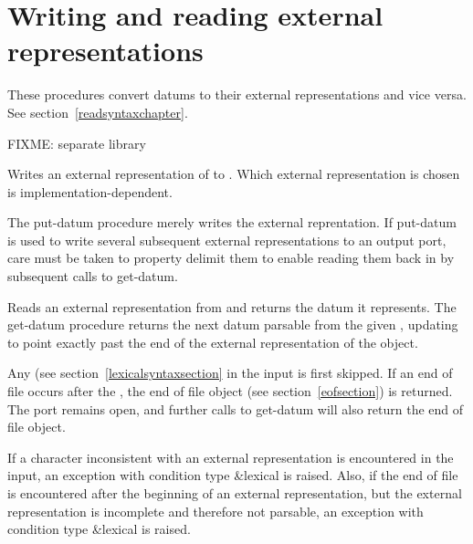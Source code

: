 \section{Writing and reading external representations}
\label{datumiosection}

These procedures convert datums to their external representations and
vice versa.  See section~\ref{readsyntaxchapter}.

FIXME: separate library

\begin{entry}{%
}

Writes an external representation of  to .
Which external representation is chosen is implementation-dependent.

\begin{note}
  The {\cf put-datum} procedure merely writes the external
  reprentation.  If {\cf put-datum} is used to write several
  subsequent external representations to an output port, care must be
  taken to property delimit them to enable reading them back in by
  subsequent calls to {\cf get-datum}.
\end{note}
\end{entry}

\begin{entry}{%
}
 
Reads an external representation from  and returns the
datum it represents.  The {\cf get-datum} procedure returns the next
datum parsable from the given , updating
 to point exactly past the end of the external
representation of the object.

Any  (see section~\ref{lexicalsyntaxsection} in
the input is first skipped.  If an end of file occurs after the
, the end of file object (see
section~\ref{eofsection}) is returned.  The port remains open, and
further calls to {\cf get-datum} will also return the end of file
object.

If a character inconsistent with an external representation is
encountered in the input, an exception with condition type
{\cf\&lexical} is raised.  Also, if the end of file is encountered
after the beginning of an external representation, but the external
representation is incomplete and therefore not parsable, an exception
with condition type {\cf\&lexical} is raised.
\end{entry}

